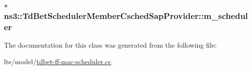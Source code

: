\subsubsection[{\texorpdfstring{m\+\_\+scheduler}{m_scheduler}}]{ $\ast$ ns3\+::\+Td\+Bet\+Scheduler\+Member\+Csched\+Sap\+Provider\+::m\+\_\+scheduler\hspace{0.3cm}{\ttfamily [private]}}\hypertarget{classns3_1_1TdBetSchedulerMemberCschedSapProvider_a3c76a535c04f36a05acd40996f5bdf89}{}\label{classns3_1_1TdBetSchedulerMemberCschedSapProvider_a3c76a535c04f36a05acd40996f5bdf89}


The documentation for this class was generated from the following file\+:\begin{DoxyCompactItemize}
\item 
lte/model/\hyperlink{lte_2model_2tdbet-ff-mac-scheduler_8cc}{tdbet-\/ff-\/mac-\/scheduler.\+cc}\end{DoxyCompactItemize}
